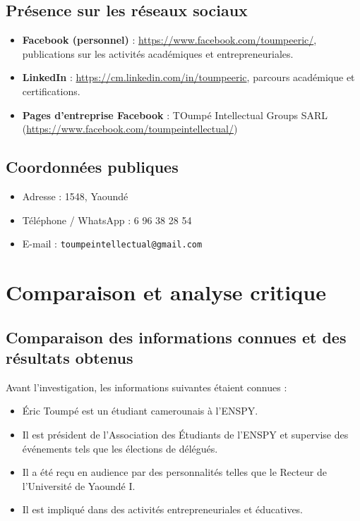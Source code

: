 \documentclass[memoire, 12pt]{report}
\begin{document}
\section{Présence sur les réseaux sociaux}
\begin{itemize}
    \item \textbf{Facebook (personnel)} : \url{https://www.facebook.com/toumpeeric/}, publications sur les activités académiques et entrepreneuriales.
    \item \textbf{LinkedIn} : \url{https://cm.linkedin.com/in/toumpeeric}, parcours académique et certifications.
    \item \textbf{Pages d’entreprise Facebook} : TOumpé Intellectual Groups SARL (\url{https://www.facebook.com/toumpeintellectual/})
\end{itemize}

\section{Coordonnées publiques}
\begin{itemize}
    \item Adresse : 1548, Yaoundé
    \item Téléphone / WhatsApp : 6 96 38 28 54
    \item E-mail : \texttt{toumpeintellectual@gmail.com}
\end{itemize}

\chapter{Comparaison et analyse critique}

\section{Comparaison des informations connues et des résultats obtenus}
Avant l’investigation, les informations suivantes étaient connues :
\begin{itemize}
    \item Éric Toumpé est un étudiant camerounais à l’ENSPY.
    \item Il est président de l’Association des Étudiants de l’ENSPY et supervise des événements tels que les élections de délégués.
    \item Il a été reçu en audience par des personnalités telles que le Recteur de l’Université de Yaoundé I.
    \item Il est impliqué dans des activités entrepreneuriales et éducatives.
\end{itemize}
\end{document}

